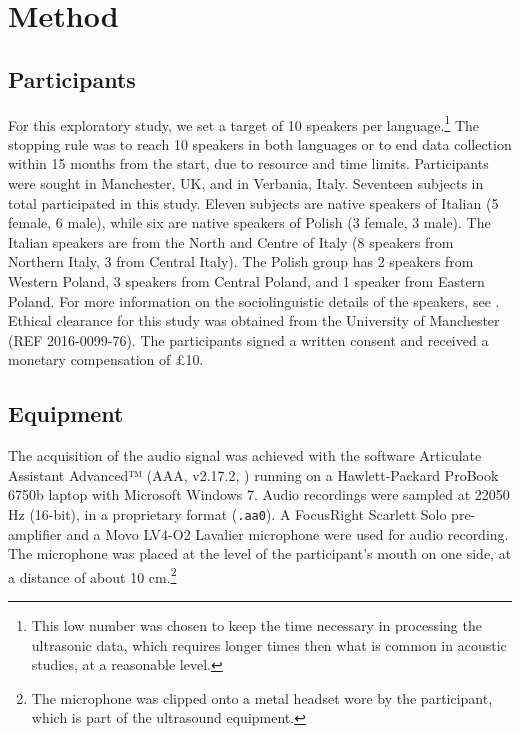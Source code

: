 \documentclass[12pt,]{article}
\let\rmarkdownfootnote\footnote%
\def\footnote{\protect\rmarkdownfootnote}
\begin{document}
\hypertarget{method}{%
\section{Method}\label{method}}

\label{s:method}

\hypertarget{participants}{%
\subsection{Participants}\label{participants}}

For this exploratory study, we set a target of 10 speakers per
language.\footnote{This low number was chosen to keep the time necessary in processing the ultrasonic data, which requires longer times then what is common in acoustic studies, at a reasonable level.
} The stopping rule was to reach 10 speakers in both languages or to end
data collection within 15 months from the start, due to resource and
time limits. Participants were sought in Manchester, UK, and in
Verbania, Italy. Seventeen subjects in total participated in this study.
Eleven subjects are native speakers of Italian (5 female, 6 male), while
six are native speakers of Polish (3 female, 3 male). The Italian
speakers are from the North and Centre of Italy (8 speakers from
Northern Italy, 3 from Central Italy). The Polish group has 2 speakers
from Western Poland, 3 speakers from Central Poland, and 1 speaker from
Eastern Poland. For more information on the sociolinguistic details of
the speakers, see . Ethical clearance for this study
was obtained from the University of Manchester (REF 2016-0099-76). The
participants signed a written consent and received a monetary
compensation of £10.

\hypertarget{equipment}{%
\subsection{Equipment}\label{equipment}}

The acquisition of the audio signal was achieved with the software
Articulate Assistant Advanced™ (AAA, v2.17.2, \citealt{articulate2011})
running on a Hawlett-Packard ProBook 6750b laptop with Microsoft Windows
7. Audio recordings were sampled at 22050 Hz (16-bit), in a proprietary
format (\texttt{.aa0}). A FocusRight Scarlett Solo pre-amplifier and a
Movo LV4-O2 Lavalier microphone were used for audio recording. The
microphone was placed at the level of the participant's mouth on one
side, at a distance of about 10
cm.\footnote{The microphone was clipped onto a metal headset wore by the participant, which is part of the ultrasound equipment.}
\end{document}

